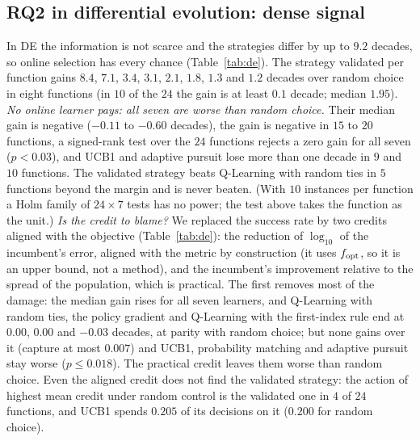 \documentclass[conference,a4paper]{IEEEtran}
\begin{document}
\subsection{RQ2 in differential evolution: dense signal}
\label{sec:de}
In DE the information is not scarce and the strategies differ by up to $9.2$ decades, so online selection has every chance (Table~\ref{tab:de}).
The strategy validated per function gains $8.4$, $7.1$, $3.4$, $3.1$, $2.1$, $1.8$, $1.3$ and $1.2$ decades over random choice in eight functions (in $10$ of the $24$ the gain is at least $0.1$ decade; median $1.95$).
\emph{No online learner pays: all seven are worse than random choice.} Their median gain is negative ($-0.11$ to $-0.60$ decades), the gain is negative in $15$ to $20$ functions, a signed-rank test over the $24$ functions rejects a zero gain for all seven ($p<0.03$), and UCB1 and adaptive pursuit lose more than one decade in $9$ and $10$ functions.
The validated strategy beats Q-Learning with random ties in $5$ functions beyond the margin and is never beaten. (With $10$ instances per function a Holm family of $24\times7$ tests has no power; the test above takes the function as the unit.)
\emph{Is the credit to blame?} We replaced the success rate by two credits aligned with the objective (Table~\ref{tab:de}): the reduction of $\log_{10}$ of the incumbent's error, aligned with the metric by construction (it uses $f_{\rm opt}$, so it is an upper bound, not a method), and the incumbent's improvement relative to the spread of the population, which is practical.
The first removes most of the damage: the median gain rises for all seven learners, and Q-Learning with random ties, the policy gradient and Q-Learning with the first-index rule end at $0.00$, $0.00$ and $-0.03$ decades, at parity with random choice; but none gains over it (capture at most $0.007$) and UCB1, probability matching and adaptive pursuit stay worse ($p\le0.018$).
The practical credit leaves them worse than random choice.
Even the aligned credit does not find the validated strategy: the action of highest mean credit under random control is the validated one in $4$ of $24$ functions, and UCB1 spends $0.205$ of its decisions on it ($0.200$ for random choice).


\end{document}
